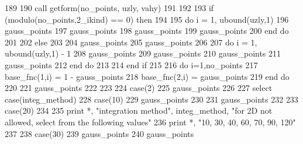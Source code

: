 \begin{DoxyCode}
189 
190           \textcolor{keyword}{call }getform(no\_points, uzly, vahy)
191 
192 
193           \textcolor{keywordflow}{if} (modulo(no\_points,2\_ikind) == 0) \textcolor{keywordflow}{then}
194 
195             \textcolor{keywordflow}{do} i = 1, ubound(uzly,1) 
196               gauss_points%
197               gauss_points%
198               gauss_points%
199               gauss_points%
200 \textcolor{keywordflow}{            end do}
201 
202           \textcolor{keywordflow}{else}
203 
204             gauss_points%
205             gauss_points%
206 
207             \textcolor{keywordflow}{do} i = 1, ubound(uzly,1) - 1 
208               gauss_points%
209               gauss_points%
210               gauss_points%
211               gauss_points%
212 \textcolor{keywordflow}{            end do}
213 
214 \textcolor{keywordflow}{          end if}
215 
216           \textcolor{keywordflow}{do} i=1,no\_points
217             base_fnc(1,i) = 1 - gauss_points%
218             base_fnc(2,i) = gauss_points%
219 \textcolor{keywordflow}{          end do}
220           
221           gauss_points%
222           
223 
224         \textcolor{keywordflow}{case}(2)
225           gauss_points%
226 
227           \textcolor{keywordflow}{select case}(integ_method)
228             \textcolor{keywordflow}{case}(10)
229               gauss_points%
230 \textcolor{comment}{}
231 \textcolor{comment}{              gauss_points%
232 \textcolor{comment}{}
233 \textcolor{comment}{            }\textcolor{keywordflow}{case}(20)
234 
235               print *, \textcolor{stringliteral}{"integration method"}, integ_method,   \textcolor{stringliteral}{"for 2D not allowed, select from the following
       values"}
236               print *, \textcolor{stringliteral}{"10, 30, 40, 60, 70, 90, 120"}
237 
238             \textcolor{keywordflow}{case}(30) 
239               gauss_points%
240 \textcolor{comment}{              gauss_points%
}}
\end{DoxyCode}
